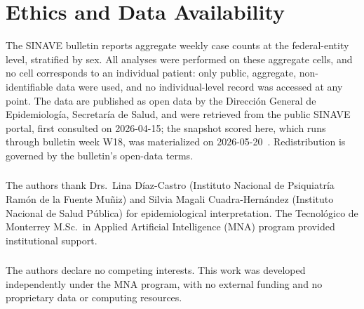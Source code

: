 \documentclass[runningheads]{llncs}
\begin{document}
\section*{Ethics and Data Availability}
The SINAVE bulletin reports aggregate weekly case counts at the
federal-entity level, stratified by sex. All analyses were performed
on these aggregate cells, and no cell corresponds to an individual
patient: only public, aggregate, non-identifiable data were used, and
no individual-level record was accessed at any point.
The data are published as open data by the Direcci\'on General de
Epidemiolog\'ia, Secretar\'ia de Salud, and were retrieved from the
public SINAVE portal, first consulted on 2026-04-15; the snapshot scored
here, which runs through bulletin week W18, was materialized on
2026-05-20~\cite{sinave2026}. Redistribution
is governed by the bulletin's open-data terms.

\begin{credits}
\subsubsection{\ackname}
The authors thank Drs.~Lina D\'iaz-Castro (Instituto Nacional de
Psiquiatr\'ia Ram\'on de la Fuente Mu\~niz) and Silvia Magali
Cuadra-Hern\'andez (Instituto Nacional de Salud P\'ublica) for
epidemiological interpretation. The Tecnol\'ogico de Monterrey
M.Sc.\ in Applied Artificial Intelligence (MNA) program provided
institutional support.

\subsubsection{\discintname}
The authors declare no competing interests. This work was developed
independently under the MNA program, with no external funding and no
proprietary data or computing resources.
\end{credits}



%
\appendix
\end{document}
